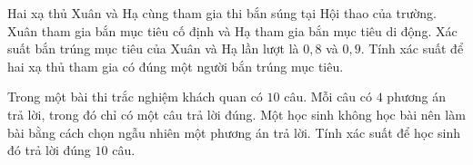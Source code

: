 \begin{bt}%

	Hai xạ thủ Xuân và Hạ cùng tham gia thi bắn súng tại Hội thao của trường. Xuân tham gia bắn mục tiêu cố định và Hạ tham gia bắn mục tiêu di động. Xác suất bắn trúng mục tiêu của Xuân và Hạ lần lượt là $0{,}8$ và $0{,}9$. Tính xác suất để hai xạ thủ tham gia có đúng một người bắn trúng mục tiêu.
\end{bt}

\begin{bt}%

	Trong một bài thi trắc nghiệm khách quan có $10$ câu. Mỗi câu có $4$ phương án trả lời, trong đó chỉ có một câu trả lời đúng. Một học sinh không học bài nên làm bài bằng cách chọn ngẫu nhiên một phương án trả lời. Tính xác suất để học sinh đó trả lời đúng $10$ câu.
	
\end{bt}


